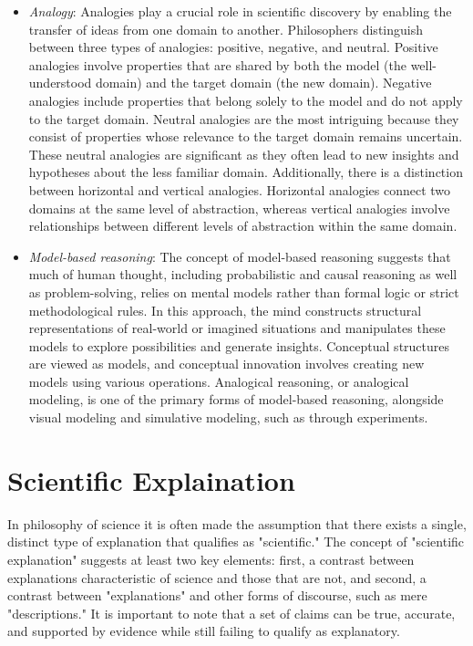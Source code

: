 \begin{itemize}

\item \emph{Analogy}: Analogies play a crucial role in scientific discovery by enabling the transfer of ideas from one domain to another. Philosophers distinguish between three types of analogies: positive, negative, and neutral. Positive analogies involve properties that are shared by both the model (the well-understood domain) and the target domain (the new domain). Negative analogies include properties that belong solely to the model and do not apply to the target domain. Neutral analogies are the most intriguing because they consist of properties whose relevance to the target domain remains uncertain. These neutral analogies are significant as they often lead to new insights and hypotheses about the less familiar domain. Additionally, there is a distinction between horizontal and vertical analogies. Horizontal analogies connect two domains at the same level of abstraction, whereas vertical analogies involve relationships between different levels of abstraction within the same domain.

\item \emph{Model-based reasoning}: The concept of model-based reasoning suggests that much of human thought, including probabilistic and causal reasoning as well as problem-solving, relies on mental models rather than formal logic or strict methodological rules. In this approach, the mind constructs structural representations of real-world or imagined situations and manipulates these models to explore possibilities and generate insights. Conceptual structures are viewed as models, and conceptual innovation involves creating new models using various operations. Analogical reasoning, or analogical modeling, is one of the primary forms of model-based reasoning, alongside visual modeling and simulative modeling, such as through experiments.

\end{itemize}

%
%

\section{Scientific Explaination}

In philosophy of science it is often made the assumption that there exists a single, distinct type of explanation that qualifies as "scientific." The concept of "scientific explanation" suggests at least two key elements: first, a contrast between explanations characteristic of science and those that are not, and second, a contrast between "explanations" and other forms of discourse, such as mere "descriptions." It is important to note that a set of claims can be true, accurate, and supported by evidence while still failing to qualify as explanatory.

